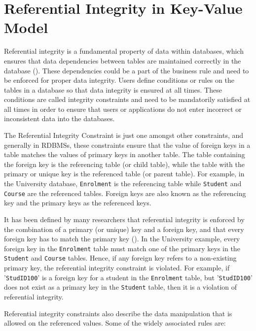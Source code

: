 \section{Referential Integrity in Key-Value
Model}\label{s:referential-integrity} 

Referential integrity is a fundamental property of data within databases,  
which ensures that data dependencies between tables are maintained correctly in
the database ().  These dependencies could be a part of the
business rule and need to be enforced for proper data integrity.  Users define
conditions or rules on the tables in a database so that data integrity is
ensured at all times.  These conditions are called integrity constraints and
need to be mandatorily satisfied at all times in order to ensure that users or
applications do not enter incorrect or inconsistent data into the databases.

The Referential Integrity Constraint is just one amongst other constraints,  
and generally in \acp{RDBMS},   these constraints ensure that the value of
foreign keys in a table matches the values of primary keys in another table. 
The table containing the foreign key is the referencing table (or child table),
while the table with the primary or unique key is the referenced table (or
parent table).
For example,   in the University database,   \texttt{Enrolment} is the
referencing table while \texttt{Student} and \texttt{Course} are the referenced
tables.  Foreign keys are also known as the referencing key and
the primary keys as the referenced keys. 

It has been defined by many researchers that referential integrity is enforced
by the combination of a primary (or unique) key and a foreign key,   and that
every foreign key has to match the primary key ().  In the
University example,   every foreign key in the \texttt{Enrolment} table must
match one of the primary keys in the \texttt{Student} and \texttt{Course}
tables.
Hence,   if any foreign key refers to a non-existing primary key,   the
referential integrity constraint is violated.   For example,   if
'\texttt{StudID100}' is a foreign key for a student in the \texttt{Enrolment}
table,   but '\texttt{StudID100}' does not exist as a primary key in the
\texttt{Student} table,   then it is a violation of referential integrity.
 
Referential integrity constraints also describe the data manipulation that is
allowed on the referenced values.  Some of the widely associated rules are:


